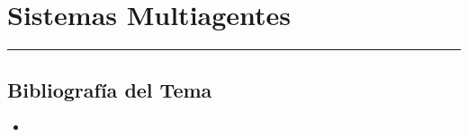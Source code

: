 \chapter{Sistemas Multiagentes}



\bigskip
\noindent\rule{\textwidth}{0.4pt} 

\section*{Bibliografía del Tema}

\begin{itemize}
    \item
\end{itemize}
\newpage